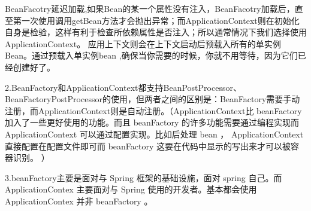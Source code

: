 \documentclass[../../../interview-questions.tex]{subfiles}
\begin{document}
BeanFacotry延迟加载,如果Bean的某一个属性没有注入，BeanFacotry加载后，直至第一次使用调用getBean方法才会抛出异常；而ApplicationContext则在初始化自身是检验，这样有利于检查所依赖属性是否注入；所以通常情况下我们选择使用 ApplicationContext。
应用上下文则会在上下文启动后预载入所有的单实例Bean。通过预载入单实例bean ,确保当你需要的时候，你就不用等待，因为它们已经创建好了。

2.BeanFactory和ApplicationContext都支持BeanPostProcessor、BeanFactoryPostProcessor的使用，但两者之间的区别是：BeanFactory需要手动注册，而ApplicationContext则是自动注册。（ApplicationContext比 beanFactory 加入了一些更好使用的功能。而且 beanFactory 的许多功能需要通过编程实现而 ApplicationContext 可以通过配置实现。比如后处理 bean ， ApplicationContext 直接配置在配置文件即可而 beanFactory 这要在代码中显示的写出来才可以被容器识别。 ）

3.beanFactory主要是面对与 Spring 框架的基础设施，面对 spring 自己。而 ApplicationContex 主要面对与 Spring 使用的开发者。基本都会使用 ApplicationContex 并非 beanFactory 。
\end{document}
